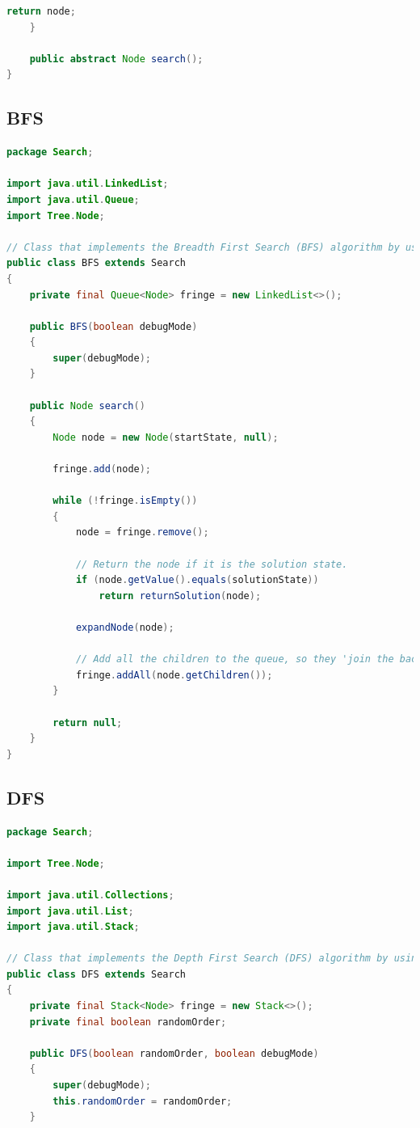 \documentclass{article}
\begin{document}
\begin{appendices}
\begin{lstlisting}[language=Java]
		return node;
	}

	public abstract Node search();
}
\end{lstlisting}
		
		\newpage
		\subsection{BFS}
\begin{lstlisting}[language=Java]
package Search;

import java.util.LinkedList;
import java.util.Queue;
import Tree.Node;

// Class that implements the Breadth First Search (BFS) algorithm by using a Queue to manage the fringe.
public class BFS extends Search
{
	private final Queue<Node> fringe = new LinkedList<>();
	
	public BFS(boolean debugMode)
	{
		super(debugMode);
	}
	
	public Node search()
	{
		Node node = new Node(startState, null);
	
		fringe.add(node);
	
		while (!fringe.isEmpty())
		{
			node = fringe.remove();
		
			// Return the node if it is the solution state.
			if (node.getValue().equals(solutionState))
				return returnSolution(node);
		
			expandNode(node);
		
			// Add all the children to the queue, so they 'join the back of the queue'.
			fringe.addAll(node.getChildren());
		}
	
		return null;
	}
}	
\end{lstlisting}
		
		\newpage
		\subsection{DFS}
\begin{lstlisting}[language=Java]
package Search;

import Tree.Node;

import java.util.Collections;
import java.util.List;
import java.util.Stack;

// Class that implements the Depth First Search (DFS) algorithm by using a Stack to manage the fringe.
public class DFS extends Search
{
	private final Stack<Node> fringe = new Stack<>();
	private final boolean randomOrder;
	
	public DFS(boolean randomOrder, boolean debugMode)
	{
		super(debugMode);
		this.randomOrder = randomOrder;
	}
	

\end{lstlisting}
\end{appendices}
\end{document}
